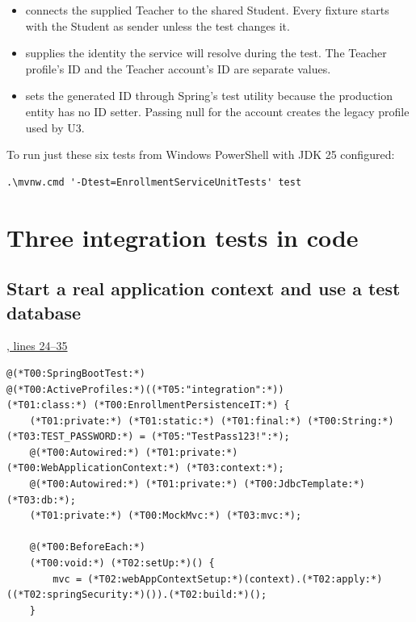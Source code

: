 \begin{itemize}
\item {} connects the supplied Teacher to the shared Student.
Every fixture starts with the Student as sender unless the test changes it.
\item {} supplies the identity the service will resolve during the
test. The Teacher profile's ID and the Teacher account's ID are separate values.
\item {} sets the generated ID through Spring's test utility because
the production entity has no ID setter. Passing null for the account creates
the legacy profile used by U3.
\end{itemize}

To run just these six tests from Windows PowerShell with JDK 25 configured:
\begin{lstlisting}[style=commands]
.\mvnw.cmd '-Dtest=EnrollmentServiceUnitTests' test
\end{lstlisting}

\clearpage
\section{Three integration tests in code}\label{sec:itcode}

\subsection{Start a real application context and use a test database}
\par\smallskip
{\small\href{\repo/blob/5d22aed7f6d4ef1e4c0b0c0dabf2962ba4b47608/src/test/java/com/example/fmschool/EnrollmentPersistenceIT.java#L24-L35}{, lines 24--35}}
\begin{lstlisting}[style=vsJava,firstnumber=24]
@(*T00:SpringBootTest:*)
@(*T00:ActiveProfiles:*)((*T05:"integration":*))
(*T01:class:*) (*T00:EnrollmentPersistenceIT:*) {
    (*T01:private:*) (*T01:static:*) (*T01:final:*) (*T00:String:*) (*T03:TEST_PASSWORD:*) = (*T05:"TestPass123!":*);
    @(*T00:Autowired:*) (*T01:private:*) (*T00:WebApplicationContext:*) (*T03:context:*);
    @(*T00:Autowired:*) (*T01:private:*) (*T00:JdbcTemplate:*) (*T03:db:*);
    (*T01:private:*) (*T00:MockMvc:*) (*T03:mvc:*);

    @(*T00:BeforeEach:*)
    (*T00:void:*) (*T02:setUp:*)() {
        mvc = (*T02:webAppContextSetup:*)(context).(*T02:apply:*)((*T02:springSecurity:*)()).(*T02:build:*)();
    }
\end{lstlisting}

